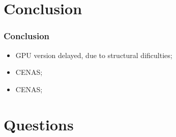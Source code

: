 \documentclass{beamer}
\begin{document}

\section{Conclusion}
\begin{frame}
	\frametitle{Conclusion}
	\begin{itemize}
		\item GPU version delayed, due to structural dificulties;
		\item CENAS;
		\item CENAS;
	\end{itemize}
\end{frame}

\section{Questions}
\begin{frame}
	\titlepage
	
	
\end{frame}
\end{document}
